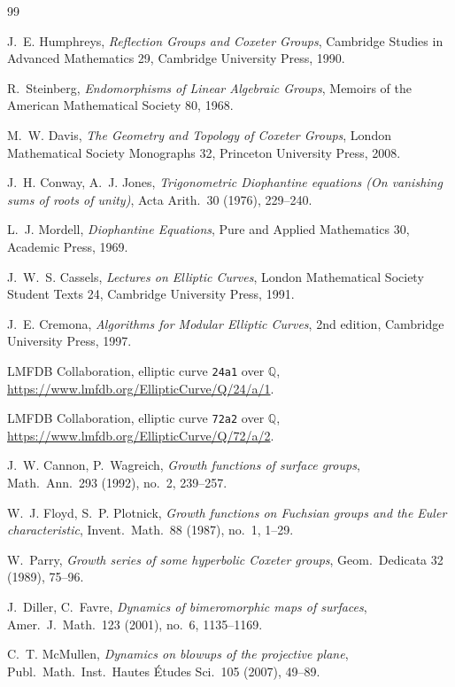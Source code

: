 \documentclass[11pt,a4paper]{article}
\theoremstyle{remark}
\theoremstyle{plain}
\begin{document}
\begin{thebibliography}{99}

J.~E. Humphreys, \emph{Reflection Groups and Coxeter Groups},
Cambridge Studies in Advanced Mathematics 29, Cambridge University
Press, 1990.

R.~Steinberg, \emph{Endomorphisms of Linear Algebraic Groups},
Memoirs of the American Mathematical Society 80, 1968.

M.~W. Davis, \emph{The Geometry and Topology of Coxeter Groups},
London Mathematical Society Monographs 32, Princeton University
Press, 2008.

J.~H. Conway, A.~J. Jones, \emph{Trigonometric Diophantine equations
(On vanishing sums of roots of unity)}, Acta Arith.\ 30 (1976),
229--240.

L.~J. Mordell, \emph{Diophantine Equations}, Pure and Applied
Mathematics 30, Academic Press, 1969.

J.~W.~S. Cassels, \emph{Lectures on Elliptic Curves}, London
Mathematical Society Student Texts 24, Cambridge University Press,
1991.

J.~E. Cremona, \emph{Algorithms for Modular Elliptic Curves},
2nd edition, Cambridge University Press, 1997.

LMFDB Collaboration, elliptic curve \texttt{24a1} over $\mathbb{Q}$,
\url{https://www.lmfdb.org/EllipticCurve/Q/24/a/1}.

LMFDB Collaboration, elliptic curve \texttt{72a2} over $\mathbb{Q}$,
\url{https://www.lmfdb.org/EllipticCurve/Q/72/a/2}.

J.~W. Cannon, P.~Wagreich, \emph{Growth functions of surface groups},
Math.\ Ann.\ 293 (1992), no.~2, 239--257.

W.~J. Floyd, S.~P. Plotnick, \emph{Growth functions on Fuchsian
groups and the Euler characteristic}, Invent.\ Math.\ 88 (1987),
no.~1, 1--29.

W.~Parry, \emph{Growth series of some hyperbolic Coxeter groups},
Geom.\ Dedicata 32 (1989), 75--96.

J.~Diller, C.~Favre, \emph{Dynamics of bimeromorphic maps of
surfaces}, Amer.\ J.\ Math.\ 123 (2001), no.~6, 1135--1169.

C.~T. McMullen, \emph{Dynamics on blowups of the projective plane},
Publ.\ Math.\ Inst.\ Hautes \'Etudes Sci.\ 105 (2007), 49--89.


\end{thebibliography}
\end{document}
